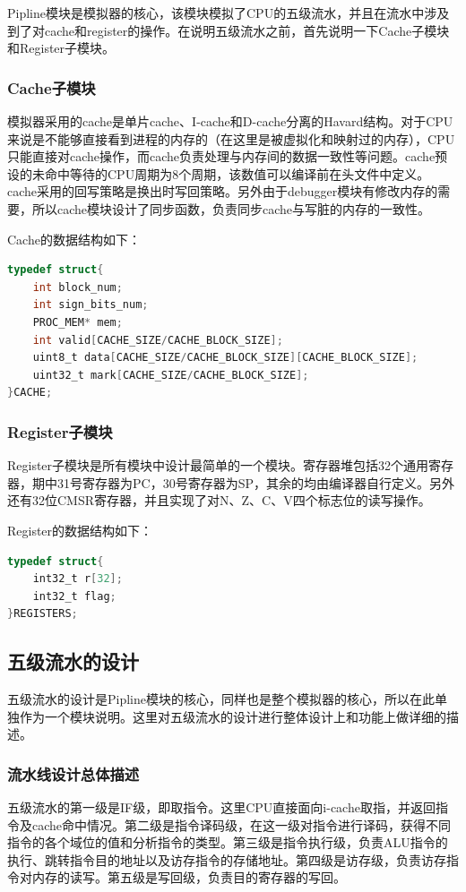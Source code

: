 \documentclass[12pt,a4paper]{article}
\begin{document}
Pipline模块是模拟器的核心，该模块模拟了CPU的五级流水，并且在流水中涉及到了对cache和register的操作。在说明五级流水之前，首先说明一下Cache子模块和Register子模块。

\subsubsection{Cache子模块}

模拟器采用的cache是单片cache、I-cache和D-cache分离的Havard结构。对于CPU来说是不能够直接看到进程的内存的（在这里是被虚拟化和映射过的内存），CPU只能直接对cache操作，而cache负责处理与内存间的数据一致性等问题。cache预设的未命中等待的CPU周期为8个周期，该数值可以编译前在头文件中定义。cache采用的回写策略是换出时写回策略。另外由于debugger模块有修改内存的需要，所以cache模块设计了同步函数，负责同步cache与写脏的内存的一致性。

Cache的数据结构如下：

\begin{lstlisting}[language={C}]
typedef struct{
    int block_num;
    int sign_bits_num;
    PROC_MEM* mem;
    int valid[CACHE_SIZE/CACHE_BLOCK_SIZE];
    uint8_t data[CACHE_SIZE/CACHE_BLOCK_SIZE][CACHE_BLOCK_SIZE];
    uint32_t mark[CACHE_SIZE/CACHE_BLOCK_SIZE];
}CACHE;
\end{lstlisting}

\subsubsection{Register子模块}

Register子模块是所有模块中设计最简单的一个模块。寄存器堆包括32个通用寄存器，期中31号寄存器为PC，30号寄存器为SP，其余的均由编译器自行定义。另外还有32位CMSR寄存器，并且实现了对N、Z、C、V四个标志位的读写操作。

Register的数据结构如下：

\begin{lstlisting}[language={C}]
typedef struct{
    int32_t r[32];
    int32_t flag;
}REGISTERS;
\end{lstlisting}

\subsection{五级流水的设计}

五级流水的设计是Pipline模块的核心，同样也是整个模拟器的核心，所以在此单独作为一个模块说明。这里对五级流水的设计进行整体设计上和功能上做详细的描述。

\subsubsection{流水线设计总体描述}
五级流水的第一级是IF级，即取指令。这里CPU直接面向i-cache取指，并返回指令及cache命中情况。第二级是指令译码级，在这一级对指令进行译码，获得不同指令的各个域位的值和分析指令的类型。第三级是指令执行级，负责ALU指令的执行、跳转指令目的地址以及访存指令的存储地址。第四级是访存级，负责访存指令对内存的读写。第五级是写回级，负责目的寄存器的写回。
\end{document}
